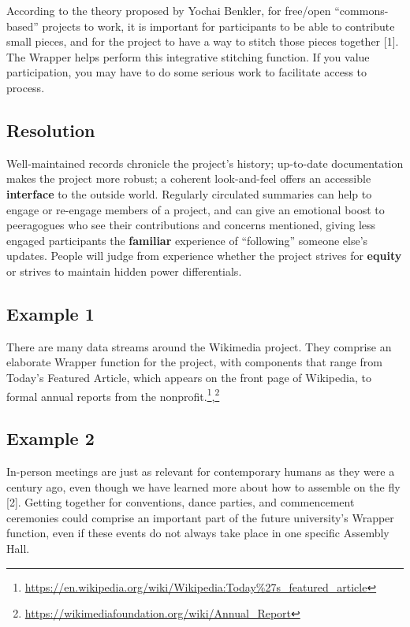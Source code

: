 According to the theory proposed by Yochai Benkler, for free/open
``commons-based'' projects to work, it is important for participants to
be able to contribute small pieces, and for the project to have a way to
stitch those pieces together {{[}1{]}}. The {{Wrapper}} helps perform
this integrative stitching function. If you value participation, you may
have to do some serious work to facilitate access to process.

\hypertarget{resolution}{%
\subsection{Resolution}\label{resolution}}

Well-maintained records chronicle the project's history; up-to-date
documentation makes the project more robust; a coherent look-and-feel
offers an accessible \textbf{interface} to the outside world. Regularly
circulated summaries can help to engage or re-engage members of a
project, and can give an emotional boost to peeragogues who see their
contributions and concerns mentioned, giving less engaged participants
the \textbf{familiar} experience of ``following'' someone else's
updates. People will judge from experience whether the project strives
for \textbf{equity} or strives to maintain hidden power differentials.

\hypertarget{example-1}{%
\subsection{Example 1}\label{example-1}}

There are many data streams around the Wikimedia project. They comprise
an elaborate {{Wrapper}} function for the project, with components that
range from Today's Featured Article, which appears on the front page of
Wikipedia, to formal annual reports from the
nonprofit.\footnote{\url{https://en.wikipedia.org/wiki/Wikipedia:Today\%27s_featured_article}},\footnote{\url{https://wikimediafoundation.org/wiki/Annual_Report}}

\hypertarget{example-2}{%
\subsection{Example 2}\label{example-2}}

In-person meetings are just as relevant for contemporary humans as they
were a century ago, even though we have learned more about how to
assemble on the fly {{[}2{]}}. Getting together for conventions, dance
parties, and commencement ceremonies could comprise an important part of
the future university's {{Wrapper}} function, even if these events do
not always take place in one specific Assembly Hall.

